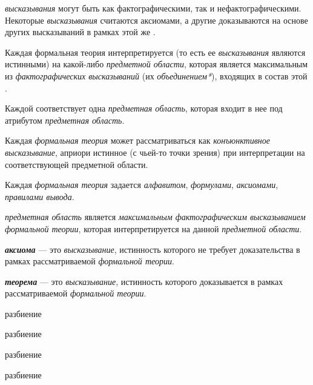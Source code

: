 \textit{высказывания} могут быть как фактографическими, так и нефактографическими. Некоторые \textit{высказывания} считаются аксиомами, а другие доказываются на основе других высказываний в рамках этой же .

Каждая формальная теория интерпретируется (то есть ее \textit{высказывания} являются истинными) на какой-либо \textit{предметной области}, которая является максимальным из \textit{фактографических высказываний} (их \textit{объединением*}),  входящих в состав этой .

Каждой  соответствует одна \textit{предметная область}, которая входит в нее под атрибутом \textit{предметная область\scnrolesign}.

Каждая \textit{формальная теория} может рассматриваться как \textit{конъюнктивное высказывание}, априори истинное (с чьей-то точки зрения) при интерпретации на соответствующей предметной области.

Каждая \textit{формальная теория} задается \textit{алфавитом}, \textit{формулами}, \textit{аксиомами}, \textit{правилами вывода}.


\textit{предметная область} является \textit{максимальным фактографическим высказыванием} \textit{формальной теории}, которая интерпретируется на данной \textit{предметной области}.

\textbf{\textit{аксиома}} --- это \textit{высказывание}, истинность которого не требует доказательства в рамках рассматриваемой \textit{формальной теории}.

\textbf{\textit{теорема}} --- это \textit{высказывание}, истинность которого доказывается в рамках рассматриваемой \textit{формальной теории}.

\begin{SCn}
\begin{scnrelfromset}{разбиение}
\end{scnrelfromset}
\begin{scnrelfromset}{разбиение}
\end{scnrelfromset}
\end{SCn}
\begin{SCn}
\begin{scnrelfromset}{разбиение}
\end{scnrelfromset}
\begin{scnrelfromset}{разбиение}
	\begin{scnindent}
	\end{scnindent}
\end{scnrelfromset}
\end{SCn}


